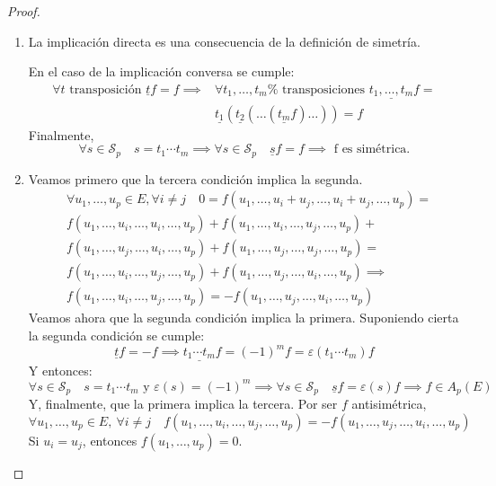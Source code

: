 \begin{proof}
    ~
    \begin{enumerate}
        \item
            La implicación directa es una consecuencia de la
            definición de simetría.

            En el caso de la implicación conversa se cumple:
            \[
                \begin{split}
                    \forall t \text{ transposición } \underline{t}f = f
                    \implies & \forall t_1,\dots ,t_m \text{%
                    transposiciones } \underline{t_1,\dots,t_m} f =\\
                    &\underline{t_1}(\underline{t_2}(\dots (\underline{t_m}f)\dots))
                    = f
                \end{split}
            \]
            Finalmente,
            \[
                \forall s \in \mathcal{S}_p \quad s = t_1 \cdots t_m
                \implies \forall s \in \mathcal{S}_p \quad \underline{s}f
                = f \implies \text{ f es simétrica.}
            \]

        \item
            Veamos primero que la tercera condición implica la segunda.
            \[
                \begin{split}
                    &\forall u_1,\dots,u_p \in E, \forall i \neq j \quad
                    0 = f(u_1,\dots,u_i+u_j,\dots,u_i+u_j, \dots, u_p) =\\
                    &f(u_1,\dots,u_i,\dots,u_i,\dots,u_p)+ f(u_1,\dots,u_i,\dots,u_j,\dots,u_p)+\\
                    &f(u_1,\dots,u_j,\dots,u_i,\dots,u_p)+ f(u_1,\dots,u_j,\dots,u_j,\dots,u_p)=\\
                    &f(u_1,\dots,u_i,\dots,u_j,\dots,u_p)+ f(u_1,\dots,u_j,\dots,u_i,\dots,u_p)\implies\\
                    &f(u_1,\dots,u_i,\dots,u_j,\dots,u_p) = -f(u_1,\dots,u_j,\dots,u_i,\dots,u_p)
                \end{split}
            \]
            Veamos ahora que la segunda condición implica la primera.
            Suponiendo cierta la segunda condición se cumple:
            \[
                \underline{t}f = -f \implies \underline{t_1\cdots t_m}f
                = (-1)^mf = \varepsilon(t_1\cdots t_m)f
            \]
            Y entonces:
            \[
                \forall s \in \mathcal{S}_p \quad s = t_1\cdots t_m
                \text{ y } \varepsilon(s) = (-1)^m \implies \forall s\in
                \mathcal{S}_p \quad \underline{s}f = \varepsilon(s)f
                \implies f \in A_p(E)
            \]
            Y, finalmente, que la primera implica la tercera.  Por ser $
            f $ antisimétrica,
            \[
                \forall u_1,\dots,u_p \in E, \ \forall i \neq j \quad f(u_1,\dots,
                u_i, \dots, u_j, \dots, u_p) = -f(u_1,\dots, u_j, \dots,
                u_i, \dots, u_p)
            \]
            Si $ u_i = u_j $, entonces $ f(u_1, \dots, u_p) = 0 $.

    \end{enumerate}
\end{proof}
